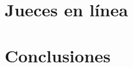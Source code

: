 \documentclass{book}
\begin{document}
    \chapter{Jueces en línea}
        
    
    \chapter{Conclusiones}
        
    
    \begin{appendices}
        
        
                    
    \end{appendices}

\backmatter
    \nocite{*}
    \printbibliography
\end{document}
